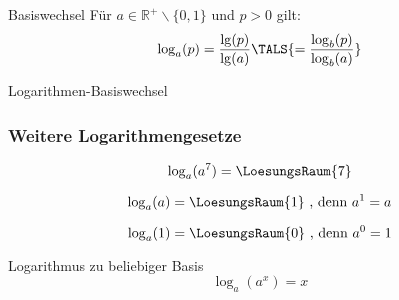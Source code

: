 \begin{gesetz}{Basiswechsel}{}
  Für $a\in\mathbb{R}^{+}\backslash\{0,1\}$ und $p>0$ gilt:
  $$\log_a(p) = \frac{\lg(p)}{\lg(a)}\TALS{ = \frac{\log_b(p)}{\log_b(a)}}$$
\end{gesetz}

\begin{beispiel}{Logarithmen-Basiswechsel}{}
\end{beispiel}

%

\newpage


\subsubsection{Weitere Logarithmengesetze}
 
 \begin{bemerkung}{}{}
   $$\log_a(a^7) = \LoesungsRaum{7}$$
\end{bemerkung}

 \begin{bemerkung}{}{}
   $$\log_a(a) = \LoesungsRaum{1} \textrm{ , denn } a^1 = a$$
\end{bemerkung}

 \begin{bemerkung}{}{}
   $$\log_a(1) = \LoesungsRaum{0} \textrm{ , denn } a^0 = 1$$
\end{bemerkung}

\begin{bemerkung}{Logarithmus zu beliebiger Basis}{}
  $$\log_a(a^x) = x$$
\end{bemerkung}




